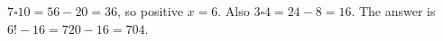 $7\square10=56-20=36$, so positive $x=6$. Also $3\square4=24-8=16$. The answer is $6!-16=720-16=\boxed{704}$.
